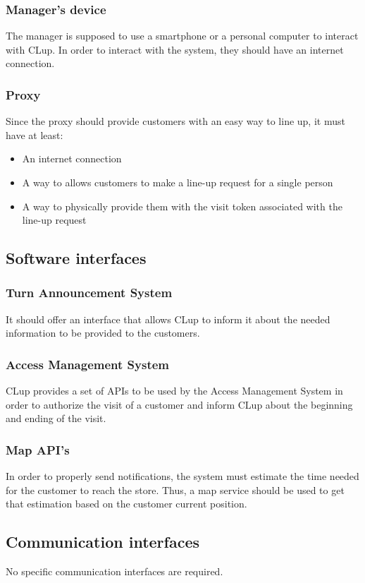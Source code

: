 \documentclass[a4paper,oneside,11pt]{book}   %
\begin{document}
    \subsubsection{Manager's device} 
    The manager is supposed to use a smartphone or a personal computer to interact with CLup. In order to interact with the system, they should have an internet connection.
    
    \subsubsection{Proxy} 
    Since the proxy should provide customers with an easy way to line up, it must have at least:
    \begin{itemize}
        \item An internet connection
        \item A way to allows customers to make a line-up request for a single person
        \item A way to physically provide them with the visit token associated with the line-up request
    \end{itemize}
    
    \subsection{Software interfaces}
    \subsubsection{Turn Announcement System}
    It should offer an interface that allows CLup to inform it about the needed information to be provided to the customers.
    \subsubsection{Access Management System}
    CLup provides a set of APIs to be used by the Access Management System in order to authorize the visit of a customer and inform CLup about the beginning and ending of the visit.
    \subsubsection{Map API's}
    In order to properly send notifications, the system must estimate the time needed for the customer to reach the store. Thus, a map service should be used to get that estimation based on the customer current position.
    \subsection{Communication interfaces}
    No specific communication interfaces are required.
    
\end{document}
